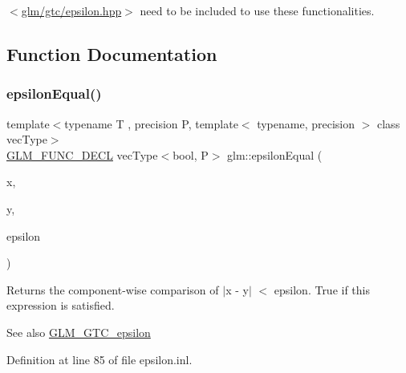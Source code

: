 $<$\hyperlink{gtc_2epsilon_8hpp}{glm/gtc/epsilon.\+hpp}$>$ need to be included to use these functionalities. 

\subsection{Function Documentation}
\mbox{\label{group__gtc__epsilon_gaca9443f217dc36587624247245522331}} 
\subsubsection{\texorpdfstring{epsilon\+Equal()}{epsilonEqual()}\hspace{0.1cm}{\footnotesize\ttfamily [1/2]}}
{\footnotesize\ttfamily template$<$typename T , precision P, template$<$ typename, precision $>$ class vec\+Type$>$ \\
\hyperlink{setup_8hpp_ab2d052de21a70539923e9bcbf6e83a51}{G\+L\+M\+\_\+\+F\+U\+N\+C\+\_\+\+D\+E\+CL} vec\+Type$<$bool, P$>$ glm\+::epsilon\+Equal (\begin{DoxyParamCaption}\item[{vec\+Type$<$ T, P $>$ const \&}]{x,  }\item[{vec\+Type$<$ T, P $>$ const \&}]{y,  }\item[{T const \&}]{epsilon }\end{DoxyParamCaption})}

Returns the component-\/wise comparison of $\vert$x -\/ y$\vert$ $<$ epsilon. True if this expression is satisfied.

\begin{DoxySeeAlso}{See also}
\hyperlink{group__gtc__epsilon}{G\+L\+M\+\_\+\+G\+T\+C\+\_\+epsilon} 
\end{DoxySeeAlso}


Definition at line 85 of file epsilon.\+inl.

\mbox{\label{group__gtc__epsilon_gaa7f227999ca09e7ca994e8b35aba47bb}} 
